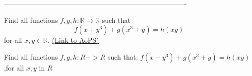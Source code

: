 -------------------------------------------------------------------------------

\begin{problem}
	Find all functions $f,g,h: \mathbb R \to \mathbb R$ such that
\[ f(x+y^3)+g(x^3+y)=h(xy)\]
for all $x,y \in \mathbb R$.
	\flushright \href{https://artofproblemsolving.com/community/c6h4100}{(Link to AoPS)}
\end{problem}



\begin{solution}
	Find all functions $ f,g,h: R->R$ such that:
$ f(x+y^3)+g(x^3+y)=h(xy)$,for all $ x,y$ in $ R$
\end{solution}



